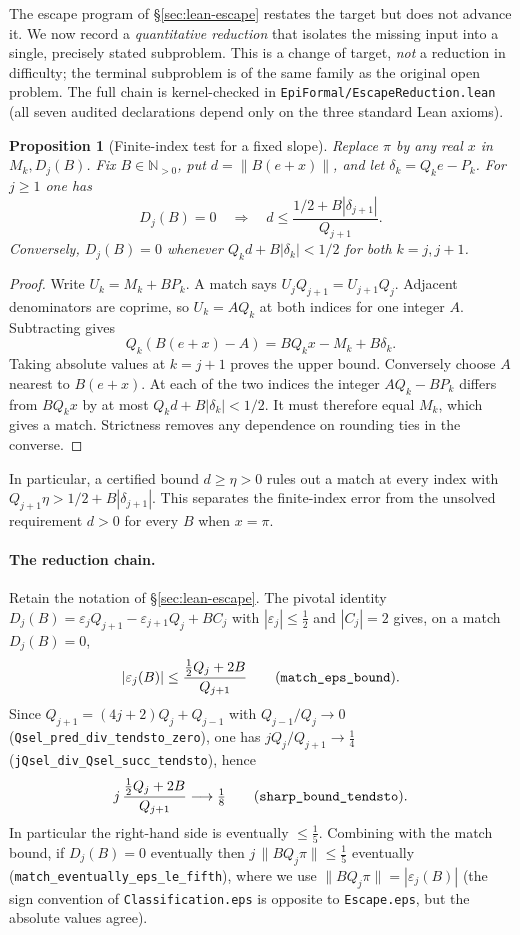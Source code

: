 \documentclass[11pt]{amsart}
\newtheorem{proposition}[theorem]{Proposition}
\theoremstyle{definition}
\theoremstyle{remark}
\numberwithin{equation}{section}
\newcommand{\N}{\mathbb{N}}
\begin{document}
The escape program of \S\ref{sec:lean-escape} restates the target but does not advance it. We now record a \emph{quantitative reduction} that isolates the missing input into a single, precisely stated subproblem. This is a change of target, \emph{not} a reduction in difficulty; the terminal subproblem is of the same family as the original open problem. The full chain is kernel-checked in \texttt{EpiFormal/\allowbreak{}EscapeReduction.lean} (all seven audited declarations depend only on the three standard Lean axioms).

\begin{proposition}[Finite-index test for a fixed slope]
\label{prop:finite-match}
Replace $\pi$ by any real $x$ in $M_k,D_j(B)$. Fix $B\in\N_{>0}$,
put $d=\|B(e+x)\|$, and let $\delta_k=Q_ke-P_k$. For $j\ge1$ one has
\[
 D_j(B)=0\quad\Longrightarrow\quad
 d\le \frac{1/2+B|\delta_{j+1}|}{Q_{j+1}}.
\]
Conversely, $D_j(B)=0$ whenever
$Q_k d+B|\delta_k|<1/2$ for both $k=j,j+1$.
\end{proposition}
\begin{proof}
Write $U_k=M_k+BP_k$. A match says
$U_jQ_{j+1}=U_{j+1}Q_j$. Adjacent denominators are coprime, so
$U_k=AQ_k$ at both indices for one integer $A$. Subtracting gives
\[
 Q_k(B(e+x)-A)=BQ_kx-M_k+B\delta_k .
\]
Taking absolute values at $k=j+1$ proves the upper bound.
Conversely choose $A$ nearest to $B(e+x)$. At each of the two
indices the integer $AQ_k-BP_k$ differs from $BQ_kx$ by at most
$Q_kd+B|\delta_k|<1/2$. It must therefore equal $M_k$,
which gives a match. Strictness removes any dependence on rounding
ties in the converse.
\end{proof}
In particular, a certified bound $d\ge\eta>0$ rules out a match
at every index with $Q_{j+1}\eta>1/2+B|\delta_{j+1}|$.
This separates the finite-index error from the unsolved requirement
$d>0$ for every $B$ when $x=\pi$.

\paragraph{The reduction chain.} Retain the notation of \S\ref{sec:lean-escape}. The pivotal identity $D_j(B)=\varepsilon_jQ_{j+1}-\varepsilon_{j+1}Q_j+BC_j$ with $|\varepsilon_j|\le\tfrac12$ and $|C_j|=2$ gives, on a match $D_j(B)=0$,
\[
|\varepsilon_j(B)|\le\frac{\tfrac12Q_j+2B}{Q_{j+1}}
\qquad\text{(\texttt{match\_eps\_bound}).}
\]
Since $Q_{j+1}=(4j+2)Q_j+Q_{j-1}$ with $Q_{j-1}/Q_j\to0$ (\texttt{Qsel\_pred\_div\_tendsto\_zero}), one has $jQ_j/Q_{j+1}\to\tfrac14$ (\texttt{jQsel\_div\_Qsel\_succ\_tendsto}), hence
\[
j\,\frac{\tfrac12Q_j+2B}{Q_{j+1}}\longrightarrow\tfrac18
\qquad\text{(\texttt{sharp\_bound\_tendsto}).}
\]
In particular the right-hand side is eventually $\le\tfrac15$. Combining with the match bound, if $D_j(B)=0$ eventually then $j\,\|BQ_j\pi\|\le\tfrac15$ eventually (\texttt{match\_eventually\_eps\_le\_fifth}), where we use $\|BQ_j\pi\|=|\varepsilon_j(B)|$ (the sign convention of \texttt{Classification.eps} is opposite to \texttt{Escape.eps}, but the absolute values agree).
\end{document}

